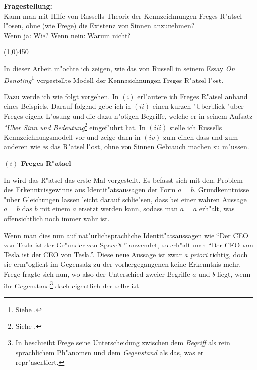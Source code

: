 \documentclass[a4paper, emulatestandardclasses, 12pt]{scrartcl}
\begin{document}
\begin{onehalfspace} 

\noindent\textbf{Fragestellung:}\\
\indent Kann man mit Hilfe von Russells Theorie der Kennzeichnungen Freges R"atsel l"osen, ohne (wie Frege) die Existenz von Sinnen anzunehmen?\\\indent Wenn ja: Wie? Wenn nein: Warum nicht?

\begin{center}
\vspace{-9pt}\line(1,0){450}
\end{center}


\noindent In dieser Arbeit m"ochte ich zeigen, wie das von Russell in seinem Essay \emph{On Denoting}\footnote{Siehe \citep*{russell1905denoting}.} vorgestellte Modell der Kennzeichnungen Freges R"atsel l"ost. %

Dazu werde ich wie folgt vorgehen. In $(i)$ erl"autere ich Freges R"atsel anhand eines Beispiels. Darauf folgend gebe ich in $(ii)$ einen kurzen "Uberblick "uber Freges eigene L"osung und die dazu n"otigen Begriffe, welche er in seinem Aufsatz \emph{"Uber Sinn und Bedeutung}\footnote{Siehe \citep{sinnundbedeutung}.} eingef"uhrt hat. In $(iii)$ stelle ich Russells Kennzeichnungsmodell vor und zeige dann in $(iv)$ zum einen dass und zum anderen wie es das R"atsel l"ost, ohne von Sinnen Gebrauch machen zu m"ussen. %
\vspace{5mm}

\noindent\textbf{$(i)$ Freges R"atsel}

\noindent In \citep{sinnundbedeutung} wird das R"atsel das erste Mal vorgestellt. Es befasst sich mit dem Problem des Erkenntnisgewinns aus Identit"atsaussagen der Form $a = b$. Grundkenntnisse "uber Gleichungen lassen leicht darauf schlie"sen, dass bei einer wahren Aussage $a = b$ das $b$ mit einem $a$ ersetzt werden kann, sodass man $a = a$ erh"alt, was offensichtlich noch immer wahr ist.

Wenn man dies nun auf nat"urlichsprachliche Identit"atsaussagen wie "`Der CEO von Tesla ist der Gr"under von SpaceX."' anwendet, so erh"alt man "`Der CEO von Tesla ist der CEO von Tesla."'. Diese neue Aussage ist zwar \emph{a priori} richtig, doch sie erm"oglicht im Gegensatz zu der vorhergegangenen keine Erkenntnis mehr. Frege fragte sich nun, wo also der Unterschied zweier Begriffe $a$ und $b$ liegt, wenn ihr Gegenstand\footnote{In \citep{begriffundgegenstand} beschreibt Frege seine Unterscheidung zwischen dem \emph{Begriff} als rein sprachlichem Ph"anomen und dem \emph{Gegenstand} als das, was er repr"asentiert.} doch eigentlich der selbe ist.\vspace{3mm}


\end{onehalfspace}
\end{document}
